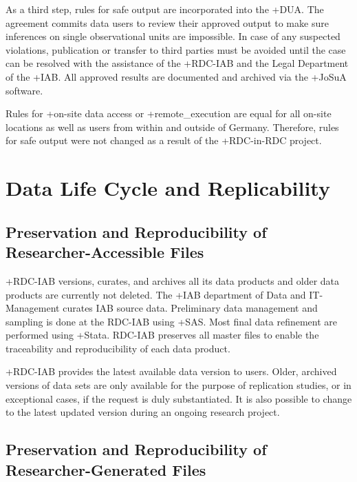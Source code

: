 \documentclass[
]{book}
\begin{document}
As a third step, rules for safe output are incorporated into the +DUA\textbar. The agreement commits data users to review their approved output to make sure inferences on single observational units are impossible. In case of any suspected violations, publication or transfer to third parties must be avoided until the case can be resolved with the assistance of the +RDC-IAB\textbar{} and the Legal Department of the +IAB\textbar. All approved results are documented and archived via the +JoSuA\textbar{} software.

Rules for +on-site\textbar{} data access or +remote\_execution\textbar{} are equal for all on-site locations as well as users from within and outside of Germany. Therefore, rules for safe output were not changed as a result of the +RDC-in-RDC\textbar{} project.

\hypertarget{data-life-cycle-and-replicability}{%
\section{Data Life Cycle and Replicability}\label{data-life-cycle-and-replicability}}

\hypertarget{preservation-and-reproducibility-of-researcher-accessible-files}{%
\subsection{Preservation and Reproducibility of Researcher-Accessible Files}\label{preservation-and-reproducibility-of-researcher-accessible-files}}

+RDC-IAB\textbar{} versions, curates, and archives all its data products and older data products are currently not deleted. The +IAB\textbar{} department of Data and IT-Management curates IAB source data. Preliminary data management and sampling is done at the RDC-IAB using +SAS\textbar. Most final data refinement are performed using +Stata\textbar. RDC-IAB preserves all master files to enable the traceability and reproducibility of each data product.

+RDC-IAB\textbar{} provides the latest available data version to users. Older, archived versions of data sets are only available for the purpose of replication studies, or in exceptional cases, if the request is duly substantiated. It is also possible to change to the latest updated version during an ongoing research project.

\hypertarget{preservation-and-reproducibility-of-researcher-generated-files}{%
\subsection{Preservation and Reproducibility of Researcher-Generated Files}\label{preservation-and-reproducibility-of-researcher-generated-files}}
\end{document}
